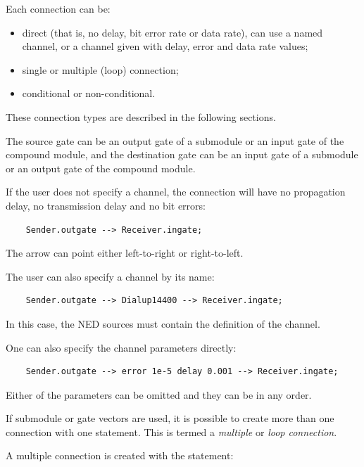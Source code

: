 Each connection can be:
\begin{itemize}
  \item{direct (that is, no delay, bit error rate or data rate), can
    use a named channel, or a channel given with delay, error and
    data rate values;}
\item{single or multiple (loop) connection;}
\item{conditional or non-conditional.}
\end{itemize}

These connection types are described in the following sections.




The source gate can be an output gate of a submodule or an input
gate of the compound module, and the destination gate can be
an input gate of a submodule or an output gate of the compound
module.


If the user does not specify a channel, the connection will have
no propagation delay, no transmission delay and no bit errors:
\begin{verbatim}
    Sender.outgate --> Receiver.ingate;
\end{verbatim}

The arrow can point either left-to-right or right-to-left.

The user can also specify a channel by its name:
\begin{verbatim}
    Sender.outgate --> Dialup14400 --> Receiver.ingate;
\end{verbatim}

In this case, the NED sources must contain the definition of
the channel.

One can also specify the channel parameters directly:
\begin{verbatim}
    Sender.outgate --> error 1e-5 delay 0.001 --> Receiver.ingate;
\end{verbatim}

Either of the parameters can be omitted and they can be in any
order.




If submodule or gate vectors are used, it is possible to create
more than one connection with one statement. This is termed a \textit{multiple}
or \textit{loop connection}.

A multiple connection is created with the 
statement:

